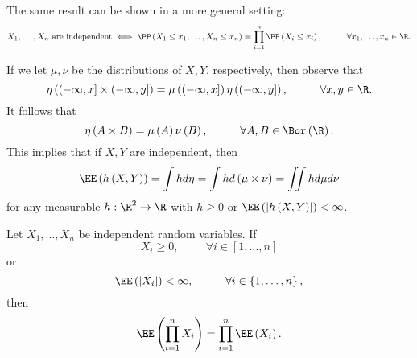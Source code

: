 \documentclass[stat901]{subfiles}
\begin{document}
    \np The same result can be shown in a more general setting: 
        \begin{equation*}
            \text{$X_1,\ldots,X_n$ are independent} \iff 
            \PP\left( X_1\leq x_1,\ldots,X_n\leq x_n \right) = \prod^{n}_{i=1}\PP\left( X_i\leq x_i \right),\hspace{1cm}\forall x_1,\ldots,x_n\in\R.
        \end{equation*}


    \np If we let $\mu,\nu$ be the distributions of $X,Y$, respectively, then observe that
    \begin{equation*}
        \eta\left( \left( -\infty,x \right]\times\left( -\infty,y \right] \right) = \mu\left( \left( -\infty,x \right] \right)\eta\left( \left( -\infty,y \right] \right),\hspace{1cm}\forall x,y\in\R.
    \end{equation*}
    It follows that
    \begin{equation*}
        \eta\left( A\times B \right) = \mu\left( A \right)\nu\left( B \right),\hspace{1cm}\forall A,B\in\Bor\left( \R \right).
    \end{equation*}
    This implies that if $X,Y$ are independent, then
    \begin{equation*}
        \EE\left( h\left( X,Y \right) \right) = \int hd\eta = \int hd\left( \mu\times\nu \right) = \iint hd\mu d\nu
    \end{equation*}
    for any measurable $h:\R^{2}\to\R$ with $h\geq 0$ or $\EE\left( \left| h\left( X,Y \right) \right| \right)<\infty$.
    
    \begin{prop}{}
        Let $X_1,\ldots,X_n$ be independent random variables. If
        \begin{equation*}
            X_i\geq 0,\hspace{1cm}\forall i\in\left[ 1,\ldots,n \right]
        \end{equation*}
        or
        \begin{equation*}
            \EE\left( \left| X_i \right| \right) < \infty,\hspace{1cm}\forall i\in\left\lbrace 1,\ldots,n \right\rbrace,
        \end{equation*}
        then
        \begin{equation*}
            \EE\left( \prod^{n}_{i=1}X_i \right) = \prod^{n}_{i=1} \EE\left( X_i \right).
        \end{equation*}
    \end{prop}
\end{document}
